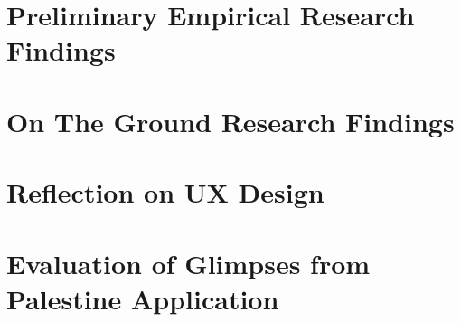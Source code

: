 
\section{Preliminary Empirical Research Findings}
\section{On The Ground Research Findings}
\section{Reflection on UX Design}
\section{Evaluation of Glimpses from Palestine Application}